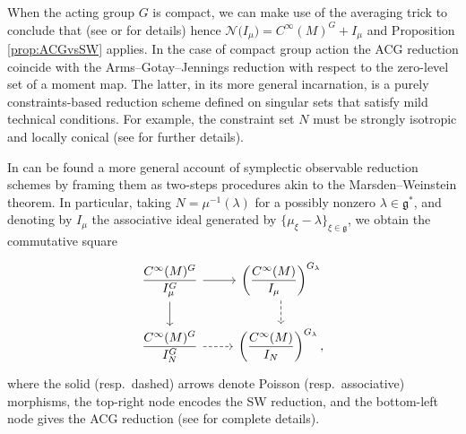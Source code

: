 \documentclass[10pt,a4paper]{amsart}
\numberwithin{equation}{section}
\newcommand{\g}{\mathfrak{g}}
\begin{document}
\begin{Remark}
 When the acting group $G$ is compact, we can make use of the averaging trick to conclude that  (see \cite[Proposition~5.12]{ArmsGotayJennings90} or \cite[Proposition~5]{Sniatycki05} for details) hence $\mathcal{N}\bigl(I_\mu\bigr)= C^\infty(M)^G + I_\mu$ and Proposition \ref{prop:ACGvsSW} applies.
 In the case of compact group action the ACG reduction coincide with the Arms--Gotay--Jennings reduction \cite[Theorem~6.1]{ArmsGotayJennings90}
 with respect to the zero-level set of a moment map.
 The latter, in its more general incarnation, is a purely constraints-based reduction scheme defined on singular sets that satisfy mild technical conditions. For example, the constraint set $N$ must be strongly isotropic and locally conical (see \cite[Section~3]{ArmsGotayJennings90} for further details).
\end{Remark}

\begin{Remark}
In \cite{Sniatycki05} can be found a more general account of symplectic observable reduction schemes by framing them as two-steps procedures akin to the Marsden--Weinstein theorem.
In particular, taking $N=\mu^{-1}(\lambda)$ for a possibly nonzero $\lambda \in \g^*$, and denoting by $I_\mu$ the associative ideal generated by $\{\mu_\xi - \lambda\}_{\xi \in \g}$, we obtain the commutative square
\begin{displaymath}
	\begin{tikzcd}
		\dfrac{C^\infty(M)^G}{I_\mu^G} \ar[r]\ar[d] &
		\left(\dfrac{C^\infty(M)}{I_\mu}\right)^{G_\lambda} \ar[d,dashed]
		\\
		\dfrac{C^\infty(M)^G}{I_N^G} \ar[dashed,r] &
		\left(\dfrac{C^\infty(M)}{I_N}\right)^{G_\lambda},
	\end{tikzcd}
\end{displaymath}
where the solid (resp.\ dashed) arrows denote Poisson (resp.\ associative) morphisms, the top-right node encodes the SW reduction, and the bottom-left node gives the ACG reduction (see \cite[Remarks~1 to~3 and equation~(11)]{Sniatycki05} for complete details).
\end{Remark}
\end{document}
